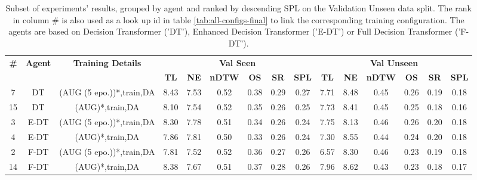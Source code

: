 \begin{table}
\centering
\caption{\label{tab:dagger_envdrop}Subset of experiments' results, grouped by agent and ranked by descending SPL on the Validation Unseen data split. The rank in column \# is also used as a look up id in table \ref{tab:all-configs-final} to link the corresponding training configuration.     \newline The agents are based on Decision Transformer ('DT'), Enhanced Decision Transformer ('E-DT') or Full Decision Transformer ('F-DT').}
\begin{tabular}{@{\hskip3pt}c@{\hskip3pt}c@{\hskip3pt}c@{\hskip3pt}c@{\hskip3pt}c@{\hskip3pt}c@{\hskip3pt}c@{\hskip3pt}c@{\hskip3pt}c@{\hskip3pt}c@{\hskip3pt}c@{\hskip3pt}c@{\hskip3pt}c@{\hskip3pt}c@{\hskip3pt}c}
\toprule
\textbf{\#} & \textbf{Agent} & \textbf{Training Details} & \multicolumn{6}{c}{\textbf{Val Seen}} & \multicolumn{6}{c}{\textbf{Val Unseen}} \\
 \textbf{~} &     \textbf{~} &                \textbf{~} &       \textbf{TL} & \textbf{NE} & \textbf{nDTW} & \textbf{OS} & \textbf{SR} & \textbf{SPL} &         \textbf{TL} & \textbf{NE} & \textbf{nDTW} & \textbf{OS} & \textbf{SR} & \textbf{SPL} \\
\midrule
          7 &             DT &  (AUG (5 epo.))*,train,DA &              8.43 &        7.53 &          0.52 &        0.38 &        0.29 &         0.27 &                7.71 &        8.48 &          0.45 &        0.26 &        0.19 &         0.18 \\
         15 &             DT &           (AUG)*,train,DA &              8.10 &        7.54 &          0.52 &        0.35 &        0.26 &         0.25 &                7.73 &        8.41 &          0.45 &        0.25 &        0.18 &         0.16 \\
          3 &           E-DT &  (AUG (5 epo.))*,train,DA &              8.30 &        7.78 &          0.51 &        0.34 &        0.26 &         0.24 &                7.75 &        8.13 &          0.46 &        0.26 &        0.20 &         0.18 \\
          4 &           E-DT &           (AUG)*,train,DA &              7.86 &        7.81 &          0.50 &        0.33 &        0.26 &         0.24 &                7.30 &        8.55 &          0.44 &        0.24 &        0.20 &         0.18 \\
          2 &           F-DT &  (AUG (5 epo.))*,train,DA &              7.81 &        7.52 &          0.52 &        0.36 &        0.27 &         0.26 &                6.57 &        8.30 &          0.46 &        0.23 &        0.19 &         0.18 \\
         14 &           F-DT &           (AUG)*,train,DA &              8.38 &        7.67 &          0.51 &        0.37 &        0.28 &         0.26 &                7.96 &        8.62 &          0.43 &        0.23 &        0.18 &         0.17 \\
\bottomrule
\end{tabular}
\end{table}
